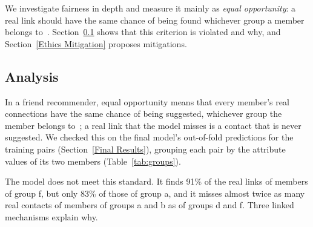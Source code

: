 \documentclass[runningheads]{llncs}
\begin{document}
We investigate fairness in depth and measure it mainly as \emph{equal opportunity}: a real link should have the same chance of being found whichever group a member belongs to~\cite{hardt2016}. Section~\ref{Ethics Analysis} shows that this criterion is violated and why, and Section~\ref{Ethics Mitigation} proposes mitigations.

\subsection{Analysis}
\label{Ethics Analysis}

In a friend recommender, equal opportunity means that every member's real connections have the same chance of being suggested, whichever group the member belongs to~\cite{hardt2016}; a real link that the model misses is a contact that is never suggested. We checked this on the final model's out-of-fold predictions for the training pairs (Section~\ref{Final Results}), grouping each pair by the attribute values of its two members (Table~\ref{tab:groups}).

The model does not meet this standard. It finds 91\% of the real links of members of group f, but only 83\% of those of group a, and it misses almost twice as many real contacts of members of groups a and b as of groups d and f. Three linked mechanisms explain why.
\end{document}
